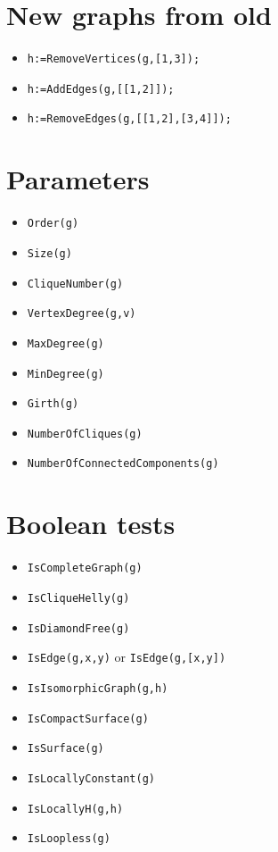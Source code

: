 \documentclass[11pt]{article}
\begin{document}
\begin{multicols}{3}
\section{New graphs from old}
\label{sec:org3dd9654}

\begin{itemize}
\item \texttt{h:=RemoveVertices(g,[1,3]);}
\item \texttt{h:=AddEdges(g,[[1,2]]);}
\item \texttt{h:=RemoveEdges(g,[[1,2],[3,4]]);}
\end{itemize}

\section{Parameters}
\label{sec:orgf22d7ba}

\begin{itemize}
\item \texttt{Order(g)}
\item \texttt{Size(g)}
\item \texttt{CliqueNumber(g)}
\item \texttt{VertexDegree(g,v)}
\item \texttt{MaxDegree(g)}
\item \texttt{MinDegree(g)}
\item \texttt{Girth(g)}
\item \texttt{NumberOfCliques(g)}
\item \texttt{NumberOfConnectedComponents(g)}
\end{itemize}

\section{Boolean tests}
\label{sec:orge0d0556}
\begin{itemize}
\item \texttt{IsCompleteGraph(g)}
\item \texttt{IsCliqueHelly(g)}
\item \texttt{IsDiamondFree(g)}
\item \texttt{IsEdge(g,x,y)} or \texttt{IsEdge(g,[x,y])}
\item \texttt{IsIsomorphicGraph(g,h)}
\item \texttt{IsCompactSurface(g)}
\item \texttt{IsSurface(g)}
\item \texttt{IsLocallyConstant(g)}
\item \texttt{IsLocallyH(g,h)}
\item \texttt{IsLoopless(g)}
\end{itemize}


\end{multicols}
\end{document}
